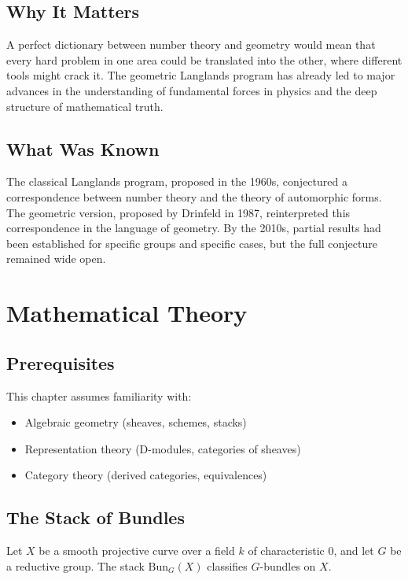 \subsection{Why It Matters}
A perfect dictionary between number theory and geometry would mean that every hard problem in one area could be translated into the other, where different tools might crack it. The geometric Langlands program has already led to major advances in the understanding of fundamental forces in physics and the deep structure of mathematical truth.

\subsection{What Was Known}
The classical Langlands program, proposed in the 1960s, conjectured a correspondence between number theory and the theory of automorphic forms. The geometric version, proposed by Drinfeld in 1987, reinterpreted this correspondence in the language of geometry. By the 2010s, partial results had been established for specific groups and specific cases, but the full conjecture remained wide open.

\section{Mathematical Theory}


\subsection{Prerequisites}
This chapter assumes familiarity with:
\begin{itemize}
\item Algebraic geometry (sheaves, schemes, stacks)
\item Representation theory (D-modules, categories of sheaves)
\item Category theory (derived categories, equivalences)
\end{itemize}

\subsection{The Stack of Bundles}

\begin{definition}
Let $X$ be a smooth projective curve over a field $k$ of characteristic 0, and let $G$ be a reductive group. The stack $\text{Bun}_G(X)$ classifies $G$-bundles on $X$.
\end{definition}

